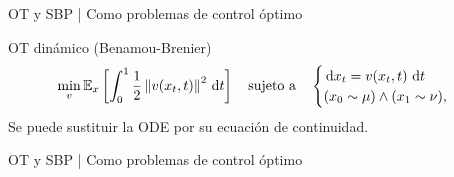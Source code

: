 \documentclass[aspectratio=43, 10pt]{beamer} %
\begin{document}
\begin{frame}{OT y SBP | Como problemas de control óptimo}
    \begin{block}{OT dinámico (Benamou-Brenier)}
        \begin{equation*}
            \min_{v} \mathbb{E}_{x}\left[\int_0^1 \frac{1}{2}\left\lVert v(x_t,t) \right\rVert^2 \,\operatorname{d}\! t\right]
            \quad\text{sujeto a}\quad
            \begin{cases}
                \,\operatorname{d}\! x_t = v(x_t,t) \,\operatorname{d}\! t \\
                (x_0\sim\mu) \wedge (x_1\sim\nu),
            \end{cases}
        \end{equation*}
        Se puede sustituir la ODE por su ecuación de continuidad.
    \end{block}
\end{frame}

\begin{frame}{OT y SBP | Como problemas de control óptimo}
\end{frame}
\end{document}
